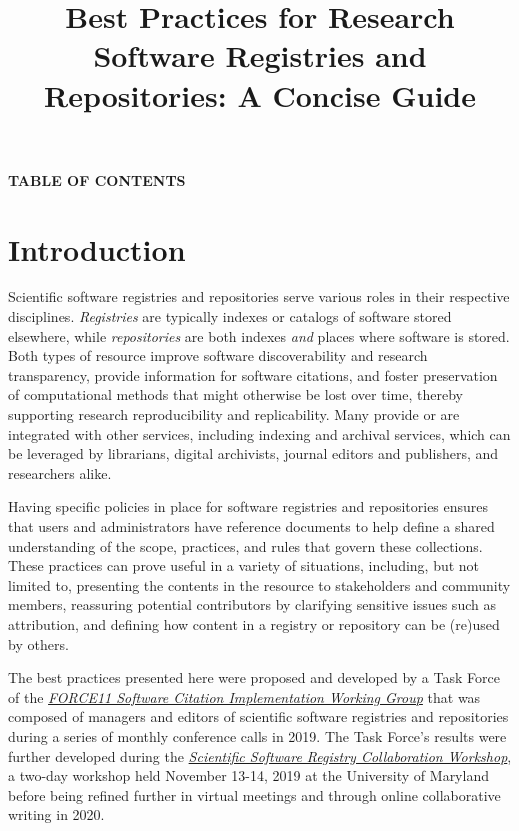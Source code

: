 \documentclass[]{article}
\title{\protect\hypertarget{_n68im9e6pq4}{}{}Best Practices for Research
Software Registries and Repositories: A Concise Guide}
\date{}
\begin{document}
\maketitle

\textbf{TABLE OF CONTENTS}

\section{Introduction}\label{introduction}

Scientific software registries and repositories serve various roles in
their respective disciplines. \emph{Registries} are typically indexes or
catalogs of software stored elsewhere, while \emph{repositories} are
both indexes \emph{and} places where software is stored. Both types of
resource improve software discoverability and research transparency,
provide information for software citations, and foster preservation of
computational methods that might otherwise be lost over time, thereby
supporting research reproducibility and replicability. Many provide or
are integrated with other services, including indexing and archival
services, which can be leveraged by librarians, digital archivists,
journal editors and publishers, and researchers alike.

Having specific policies in place for software registries and
repositories ensures that users and administrators have reference
documents to help define a shared understanding of the scope, practices,
and rules that govern these collections. These practices can prove
useful in a variety of situations, including, but not limited to,
presenting the contents in the resource to stakeholders and community
members, reassuring potential contributors by clarifying sensitive
issues such as attribution, and defining how content in a registry or
repository can be (re)used by others.

The best practices presented here were proposed and developed by a Task
Force of the
\href{https://github.com/force11/force11-sciwg}{\emph{FORCE11 Software
Citation Implementation Working Group}} that was composed of managers
and editors of scientific software registries and repositories during a
series of monthly conference calls in 2019. The Task Force's results
were further developed during the
\href{https://asclnet.github.io/SWRegistryWorkshop/}{\emph{Scientific
Software Registry Collaboration Workshop}}, a two-day workshop held
November 13-14, 2019 at the University of Maryland before being refined
further in virtual meetings and through online collaborative writing in
2020.
\end{document}
